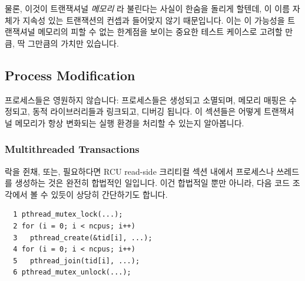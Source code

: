 물론, 이것이 트랜잭셔널 \emph{메모리} 라 불린다는 사실이 한숨을 돌리게 할텐데,
이 이름 자체가 지속성 있는 트랜잭션의 컨셉과 들어맞지 않기 때문입니다.
이는 이 가능성을 트랜잭셔널 메모리의 피할 수 없는 한계점을 보이는 중요한 테스트
케이스로 고려할 만큼, 딱 그만큼의 가치만 있습니다.

\subsection{Process Modification}
\label{sec:future:Process Modification}

프로세스들은 영원하지 않습니다:
프로세스들은 생성되고 소멸되며, 메모리 매핑은 수정되고, 동적 라이브러리들과
링크되고, 디버깅 됩니다.
이 섹션들은 어떻게 트랜잭셔널 메모리가 항상 변화되는 실행 환경을 처리할 수
있는지 알아봅니다.

\subsubsection{Multithreaded Transactions}
\label{sec:future:Multithreaded Transactions}

락을 쥔채, 또는, 필요하다면 RCU read-side 크리티컬 섹션 내에서 프로세스나
쓰레드를 생성하는 것은 완전히 합법적인 일입니다.
이건 합법적일 뿐만 아니라, 다음 코드 조각에서 볼 수 있듯이 상당히 간단하기도
합니다.

\vspace{5pt}
\begin{minipage}[t]{\columnwidth}
\small
\begin{verbatim}
  1 pthread_mutex_lock(...);
  2 for (i = 0; i < ncpus; i++)
  3   pthread_create(&tid[i], ...);
  4 for (i = 0; i < ncpus; i++)
  5   pthread_join(tid[i], ...);
  6 pthread_mutex_unlock(...);
\end{verbatim}
\end{minipage}
\vspace{5pt}

